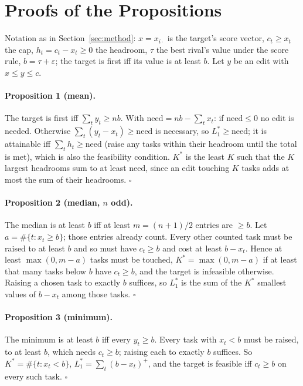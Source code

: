 \section{Proofs of the Propositions}
\label{app:proofs}

Notation as in Section~\ref{sec:method}: $x=x_{i\cdot}$ is the target's score vector, $c_t\ge x_t$ the cap, $h_t=c_t-x_t\ge0$ the headroom, $\tau$ the best rival's value under the score rule, $b=\tau+\varepsilon$; the target is first iff its value is at least $b$.
Let $y$ be an edit with $x\le y\le c$.

\paragraph{Proposition 1 (mean).}
The target is first iff $\sum_t y_t\ge nb$. With $\mathrm{need}=nb-\sum_t x_t$: if $\mathrm{need}\le0$ no edit is needed. Otherwise $\sum_t(y_t-x_t)\ge\mathrm{need}$ is necessary, so $L_1^\ast\ge\mathrm{need}$; it is attainable iff $\sum_t h_t\ge\mathrm{need}$ (raise any tasks within their headroom until the total is met), which is also the feasibility condition. $K^\ast$ is the least $K$ such that the $K$ largest headrooms sum to at least $\mathrm{need}$, since an edit touching $K$ tasks adds at most the sum of their headrooms. \hfill$\square$

\paragraph{Proposition 2 (median, $n$ odd).}
The median is at least $b$ iff at least $m=(n+1)/2$ entries are $\ge b$. Let $a=\#\{t:x_t\ge b\}$; those entries already count. Every other counted task must be raised to at least $b$ and so must have $c_t\ge b$ and cost at least $b-x_t$. Hence at least $\max(0,m-a)$ tasks must be touched, $K^\ast=\max(0,m-a)$ if at least that many tasks below $b$ have $c_t\ge b$, and the target is infeasible otherwise. Raising a chosen task to exactly $b$ suffices, so $L_1^\ast$ is the sum of the $K^\ast$ smallest values of $b-x_t$ among those tasks. \hfill$\square$

\paragraph{Proposition 3 (minimum).}
The minimum is at least $b$ iff every $y_t\ge b$. Every task with $x_t<b$ must be raised, to at least $b$, which needs $c_t\ge b$; raising each to exactly $b$ suffices. So $K^\ast=\#\{t:x_t<b\}$, $L_1^\ast=\sum_t(b-x_t)^+$, and the target is feasible iff $c_t\ge b$ on every such task. \hfill$\square$

